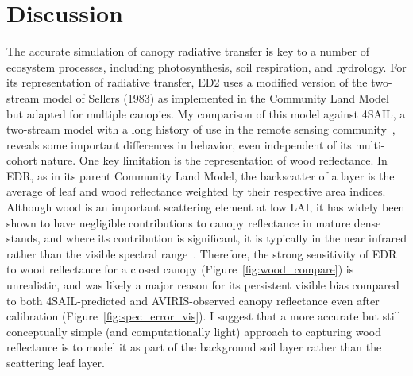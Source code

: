 \section{Discussion}

The accurate simulation of canopy radiative transfer is key to a number of ecosystem processes, including photosynthesis, soil respiration, and hydrology.
For its representation of radiative transfer, ED2 uses a modified version of the two-stream model of Sellers (1983) as implemented in the Community Land Model~\cite{clm45_note} but adapted for multiple canopies.
My comparison of this model against 4SAIL, a two-stream model with a long history of use in the remote sensing community~\cite{jacquemoud_2009_prosail}, reveals some important differences in behavior, even independent of its multi-cohort nature.
One key limitation is the representation of wood reflectance.
In EDR, as in its parent Community Land Model, the backscatter of a layer is the average of leaf and wood reflectance weighted by their respective area indices.
Although wood is an important scattering element at low LAI, it has widely been shown to have negligible contributions to canopy reflectance in mature dense stands, and where its contribution is significant, it is typically in the near infrared rather than the visible spectral range~\cite{asner_1998_biophysical,malenovsky_2008_influence,verrelst_2010_effects}.
Therefore, the strong sensitivity of EDR to wood reflectance for a closed canopy (Figure~\ref{fig:wood_compare}) is unrealistic,
and was likely a major reason for its persistent visible bias compared to both 4SAIL-predicted and AVIRIS-observed canopy reflectance even after calibration (Figure~\ref{fig:spec_error_vis}).
I suggest that a more accurate but still conceptually simple (and computationally light) approach to capturing wood reflectance is to model it as part of the background soil layer rather than the scattering leaf layer.

